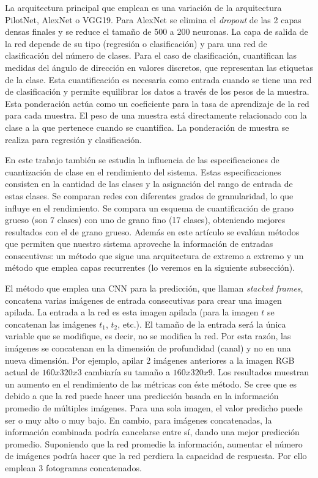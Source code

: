 La arquitectura principal que emplean es una variación de la arquitectura PilotNet, AlexNet o VGG19. Para AlexNet se elimina el \textit{dropout} de las 2 capas densas finales y se reduce el tamaño de 500 a 200 neuronas. La capa de salida de la red depende de su tipo (regresión o clasificación) y para una red de clasificación del número de clases. Para el caso de clasificación, cuantifican las medidas del ángulo de dirección en valores discretos, que representan las etiquetas de la clase. Esta cuantificación es necesaria como entrada cuando se tiene una red de clasificación y permite equilibrar los datos a través de los pesos de la muestra. Esta ponderación actúa como un coeficiente para la tasa de aprendizaje de la red para cada muestra. El peso de una muestra está directamente relacionado con la clase a la que pertenece cuando se cuantifica. La ponderación de muestra se realiza para regresión y clasificación.

En este trabajo también se estudia la influencia de las especificaciones de cuantización de clase en el rendimiento del sistema. Estas especificaciones consisten en la cantidad de las clases y la asignación del rango de entrada de estas clases. Se comparan redes con diferentes grados de granularidad, lo que influye en el rendimiento. Se compara un esquema de cuantificación de grano grueso (son 7 clases) con uno de grano fino (17 clases), obteniendo mejores resultados con el de grano grueso. Además en este artículo se evalúan métodos que permiten que nuestro sistema aproveche la información de entradas consecutivas: un método que sigue una arquitectura de extremo a extremo y un método que emplea capas recurrentes (lo veremos en la siguiente subsección).

El método que emplea una CNN para la predicción, que llaman \textit{stacked frames}, concatena varias imágenes de entrada consecutivas para crear una imagen apilada. La entrada a la red es esta imagen apilada (para la imagen $t$ se concatenan las imágenes $t_1$, $t_2$, etc.). El tamaño de la entrada será la única variable que se modifique, es decir, no se modifica la red. Por esta razón, las imágenes se concatenan en la dimensión de profundidad (canal) y no en una nueva dimensión. Por ejemplo, apilar 2 imágenes anteriores a la imagen RGB actual de $160x320x3$ cambiaría su tamaño a $160x320x9$. Los resultados muestran un aumento en el rendimiento de las métricas con éste método. Se cree que es debido a que la red puede hacer una predicción basada en la información promedio de múltiples imágenes. Para una sola imagen, el valor predicho puede ser o muy alto o muy bajo. En cambio, para imágenes concatenadas, la información combinada podría cancelarse entre sí, dando una mejor predicción promedio. Suponiendo que la red promedie la información, aumentar el número de imágenes podría hacer que la red perdiera la capacidad de respuesta. Por ello emplean 3 fotogramas concatenados.

